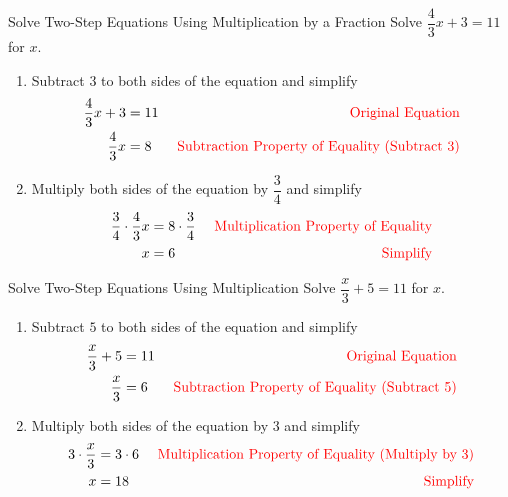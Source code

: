 \begin{example}{Solve Two-Step Equations Using Multiplication by a Fraction}{}
    Solve $\dfrac{4}{3}x+3=11$ for $x$.
    \begin{enumerate}
        \item[] Subtract $3$ to both sides of the equation and simplify
        \begin{align*}
            \dfrac{4}{3}x+3&=11&\textcolor{red}{\textrm{   Original Equation}}\\
            \dfrac{4}{3}x&=8&\textcolor{red}{\textrm{   Subtraction Property of Equality (Subtract 3)}}\\
        \end{align*}
        \item[] Multiply both sides of the equation by $\dfrac{3}{4}$ and simplify
        \begin{align*}
            \dfrac{3}{4}\cdot\dfrac{4}{3}x&=8\cdot\dfrac{3}{4}&\textcolor{red}{\textrm{   Multiplication Property of Equality}}\\
            x&=6&\textcolor{red}{\textrm{   Simplify}}
        \end{align*}      
    \end{enumerate}
\end{example}
\begin{example}{Solve Two-Step Equations Using Multiplication }{}
    Solve $\dfrac{x}{3}+5=11$ for $x$.
    \begin{enumerate}
        \item[] Subtract $5$ to both sides of the equation and simplify
        \begin{align*}
            \dfrac{x}{3}+5&=11&\textcolor{red}{\textrm{   Original Equation}}\\
            \dfrac{x}{3}&=6&\textcolor{red}{\textrm{   Subtraction Property of Equality (Subtract 5)}}\\
        \end{align*}
        \item[] Multiply both sides of the equation by 3 and simplify
        \begin{align*}
            3\cdot\dfrac{x}{3}&=3\cdot6&\textcolor{red}{\textrm{   Multiplication Property of Equality (Multiply by 3)}}\\
            x&=18&\textcolor{red}{\textrm{   Simplify}}
        \end{align*}      
    \end{enumerate}
\end{example}